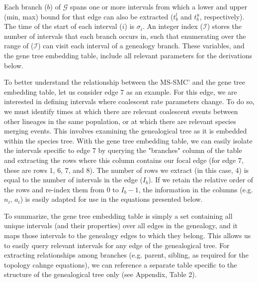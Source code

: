 \documentclass[11pt]{article}
\begin{document}
Each branch ($b$) of $\mathcal{G}$ spans one or more intervals
from which a lower and upper (min, max) bound for that 
edge can also be extracted ($t_b^l$ and $t_b^u$, respectively). 
The time of the start of each interval ($i$) is $\sigma_i$. 
An integer index ($\mathcal{I}$) stores the number of intervals that 
each branch occurs in, such that enumerating over the range
of ($\mathcal{I}$) can visit each interval of a genealogy branch.
These variables,
and the gene tree embedding table, include all relevant parameters
for the derivations below. 

To better understand the relationship between the MS-SMC' and the gene tree embedding table, let us consider edge 7 as an example. For this edge, we are interested in defining intervals where coalescent rate parameters change. To do so, we must identify times at which there are relevant coalescent events between other lineages in the same population, or at which there are relevant species merging events. This involves examining the genealogical tree as it is embedded within the species tree. With the gene tree embedding table, we can easily isolate the intervals specific to edge 7 by querying the "branches" column of the table and extracting the rows where this column contains our focal edge (for edge 7, these are rows 1, 6, 7, and 8). The number of rows we extract (in this case, 4) is equal to the number of intervals in the edge ($I_b$). If we retain the relative order of the rows and re-index them from $0$ to $I_b-1$, the information in the columns (e.g. $n_i$, $a_i$) is easily adapted for use in the equations presented below. 

To summarize, the gene tree embedding table is simply a set containing all unique intervals (and their properties) over all edges in the genealogy, and it maps those intervals to the genealogy edges to which they belong. This allows us to easily query relevant intervals for any edge of the genealogical tree. For extracting relationships among branches (e.g. parent, sibling, as required for the topology cahnge equations), we can reference a separate table specific to the structure of the genealogical tree only (see Appendix, Table 2).
\end{document}
